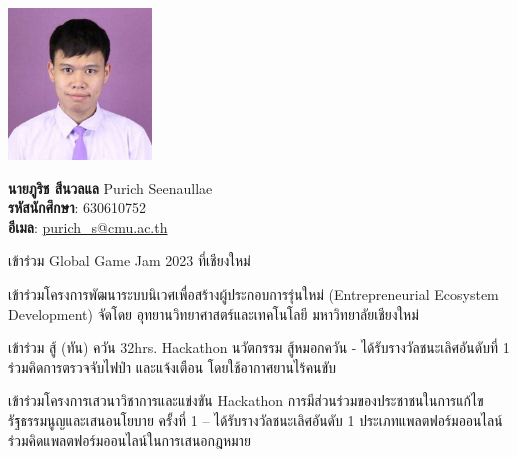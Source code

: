 \documentclass[semifinal]{cpecmu}
\begin{document}
\begin{biosketch}
  \begin{center}
    \includegraphics[width=1.5in]{./img/rich.png}
  \end{center}
  \textbf{นายภูริช สีนวลแล} Purich Seenaullae \\
  \textbf{รหัสนักศึกษา}: 630610752 \\
  \textbf{อีเมล}: \href{mailto:purich_s@cmu.ac.th}{purich\_s@cmu.ac.th}
  \item เข้าร่วม Global Game Jam 2023 ที่เชียงใหม่
  \item	เข้าร่วมโครงการพัฒนาระบบนิเวศเพื่อสร้างผู้ประกอบการรุ่นใหม่ (Entrepreneurial Ecosystem Development) จัดโดย อุทยานวิทยาศาสตร์และเทคโนโลยี มหาวิทยาลัยเชียงใหม่
  \item เข้าร่วม สู้ (ทัน) ควัน 32hrs. Hackathon นวัตกรรม สู้หมอกควัน - ได้รับรางวัลชนะเลิศอันดับที่ 1 ร่วมคิดการตรวจจับไฟป่า และแจ้งเตือน โดยใช้อากาศยานไร้คนขับ
  \item เข้าร่วมโครงการเสวนาวิชาการและแข่งขัน Hackathon การมีส่วนร่วมของประชาชนในการแก้ไขรัฐธรรมนูญและเสนอนโยบาย ครั้งที่ 1 – ได้รับรางวัลชนะเลิศอันดับ 1 ประเภทแพลตฟอร์มออนไลน์ ร่วมคิดแพลตฟอร์มออนไลน์ในการเสนอกฎหมาย
  \end{biosketch}
\fi %
\end{document}
